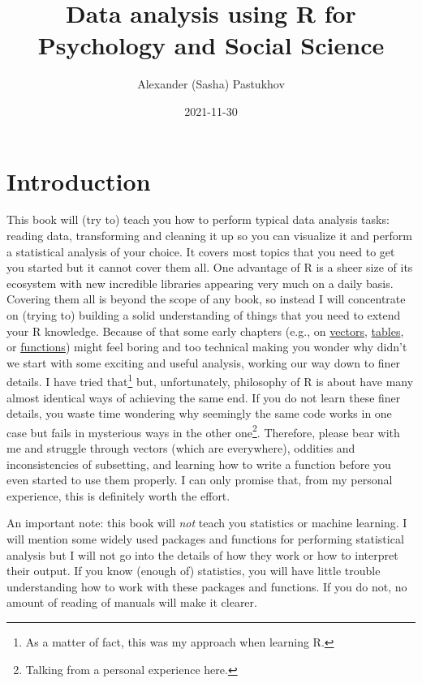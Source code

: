 \documentclass[
]{book}
\title{Data analysis using R for Psychology and Social Science}
\author{Alexander (Sasha) Pastukhov}
\date{2021-11-30}
\begin{document}
\maketitle

{
\setcounter{tocdepth}{1}
\tableofcontents
}
\hypertarget{introduction}{%
\chapter*{Introduction}\label{introduction}}

This book will (try to) teach you how to perform typical data analysis tasks: reading data, transforming and cleaning it up so you can visualize it and perform a statistical analysis of your choice. It covers most topics that you need to get you started but it cannot cover them all. One advantage of R is a sheer size of its ecosystem with new incredible libraries appearing very much on a daily basis. Covering them all is beyond the scope of any book, so instead I will concentrate on (trying to) building a solid understanding of things that you need to extend your R knowledge. Because of that some early chapters (e.g., on \protect\hyperlink{vectors}{vectors}, \protect\hyperlink{tables}{tables}, or \protect\hyperlink{ux5cux23functions}{functions}) might feel boring and too technical making you wonder why didn't we start with some exciting and useful analysis, working our way down to finer details. I have tried that\footnote{As a matter of fact, this was my approach when learning R.} but, unfortunately, philosophy of R is about have many almost identical ways of achieving the same end. If you do not learn these finer details, you waste time wondering why seemingly the same code works in one case but fails in mysterious ways in the other one\footnote{Talking from a personal experience here.}. Therefore, please bear with me and struggle through vectors (which are everywhere), oddities and inconsistencies of subsetting, and learning how to write a function before you even started to use them properly. I can only promise that, from my personal experience, this is definitely worth the effort.

An important note: this book will \emph{not} teach you statistics or machine learning. I will mention some widely used packages and functions for performing statistical analysis but I will not go into the details of how they work or how to interpret their output. If you know (enough of) statistics, you will have little trouble understanding how to work with these packages and functions. If you do not, no amount of reading of manuals will make it clearer.
\end{document}
